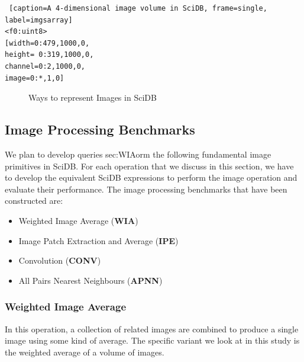 \documentclass[letterpaper,twocolumn,10pt]{article}
\begin{document}
\begin{lstlisting} [caption=A 4-dimensional image volume in SciDB, frame=single, label=imgsarray]
<f0:uint8> 
[width=0:479,1000,0, 
height= 0:319,1000,0, 
channel=0:2,1000,0,
image=0:*,1,0]
\end{lstlisting}



\begin{figure}[htp]
\centering
	\caption{Ways to represent Images in SciDB}
	\label{fig:arrays}
\end{figure}



\subsection{Image Processing Benchmarks}\label{sec:tasks}
We plan to develop queries sec:WIAorm the following fundamental image primitives in SciDB. For each operation that we discuss in this section, we have to develop the equivalent SciDB expressions to perform the image operation and evaluate their performance. The image processing benchmarks that have been constructed are:

\begin{itemize}
\item Weighted Image Average (\textbf{WIA})
\item Image Patch Extraction and Average (\textbf{IPE})
\item Convolution (\textbf{CONV})
\item All Pairs Nearest Neighbours (\textbf{APNN})
\end{itemize} 

\subsubsection{Weighted Image Average} \label{sec:WIA}
In this operation, a collection of related images are combined to produce a single image using some kind of average. The specific variant we look at in this study is the weighted average of a volume of images.
\end{document}
